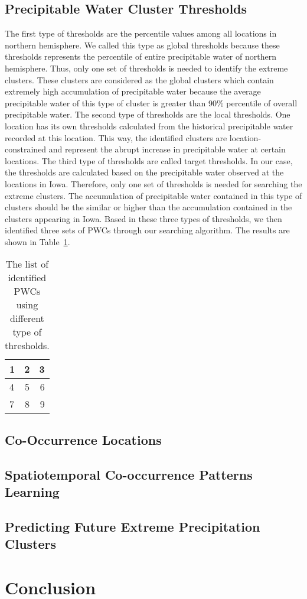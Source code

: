 \documentclass{acm_proc_article-sp}
\begin{document}
\subsection{Precipitable Water Cluster Thresholds}
The first type of thresholds are the percentile values among all locations in northern hemisphere. We called this type as global thresholds because these thresholds represents the percentile of entire precipitable water of northern hemisphere. Thus, only one set of thresholds is needed to identify the extreme clusters. These clusters are considered as the global clusters which contain extremely high accumulation of precipitable water because the average precipitable water of this type of cluster is greater than 90\% percentile of overall precipitable water.  
\newline 
The second type of thresholds are the local thresholds. One location has its own thresholds calculated from the historical precipitable water recorded at this location. This way, the identified clusters are location-constrained and represent the abrupt increase in precipitable water at certain locations. 
\newline 
The third type of thresholds are called target thresholds. In our case, the thresholds are calculated based on the precipitable water observed at the locations in Iowa. Therefore, only one set of thresholds is needed for searching the extreme clusters. The accumulation of precipitable water contained in this type of clusters should be the similar or higher than the accumulation contained in the clusters appearing in Iowa. 
\newline
Based in these three types of thresholds, we then identified three sets of PWCs through our searching algorithm. The results are shown in Table~\ref{tab:thresholds}.
\begin{table}

\centering
\caption{The list of identified PWCs using different type of thresholds.}
\begin{tabular}{| l | c | r |}
    \hline
    1 & 2 & 3 \\ \hline
    4 & 5 & 6 \\ \hline
    7 & 8 & 9 \\
    \hline
\end{tabular}
\label{tab:thresholds}
\end{table}

\subsection{Co-Occurrence Locations}

\subsection{Spatiotemporal Co-occurrence Patterns Learning}


\subsection{Predicting Future Extreme Precipitation Clusters}

\section{Conclusion}
\label{sec:Conclusion}


 
\balancecolumns
\end{document}

